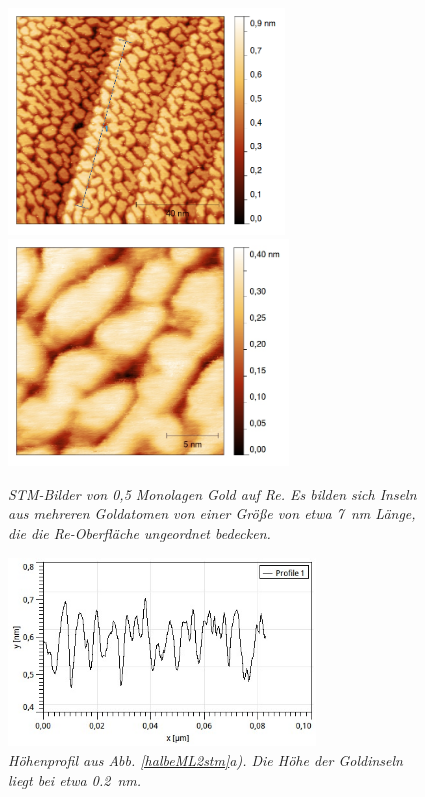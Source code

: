 \begin{figure}[htbp]
	\begin{minipage}[b]{0.5\textwidth} 
		\includegraphics[height=6cm]{profilhalbeML.png}
	\end{minipage}
	\hfill
	\begin{minipage}[b]{0.5\textwidth}
		\includegraphics[height=6cm]{halbeML.jpg}
	\end{minipage}
	\caption{\textit{STM-Bilder von 0,5 Monolagen Gold auf Re. Es bilden sich Inseln aus mehreren
	Goldatomen von einer Größe von etwa \SI{7}{nm} Länge, die die Re-Oberfläche ungeordnet bedecken.}}
	\label{halbeML2stm} 
	\vfill
	\centering
		\includegraphics[height=5cm]{profilhalbeML.jpg}
	\caption{\textit{Höhenprofil aus Abb. \ref{halbeML2stm}a). Die Höhe der Goldinseln liegt bei etwa
	\SI{0,2}{nm}.}}
	\label{profilhalbeML} 
\end{figure}


